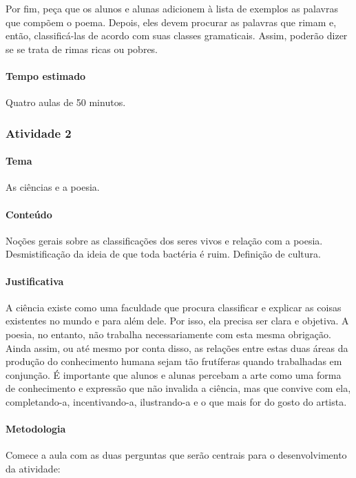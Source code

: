 \documentclass[11pt]{extarticle}
\begin{document}
Por fim, peça que os alunos e alunas adicionem à
lista de exemplos as palavras que compõem o poema.
Depois, eles devem procurar as palavras que rimam e, 
então, classificá-las de acordo
com suas classes gramaticais. Assim, poderão dizer
se se trata de rimas ricas ou pobres. 

\paragraph{Tempo estimado} Quatro aulas de 50 minutos.

\subsubsection{Atividade 2}


\paragraph{Tema} As ciências e a poesia. 

\paragraph{Conteúdo} Noções gerais sobre as classificações
dos seres vivos e relação com a poesia. Desmistificação da
ideia de que toda bactéria é ruim. Definição de cultura.

\paragraph{Justificativa} A ciência existe como uma faculdade 
que procura classificar e explicar as coisas existentes no mundo
e para além dele. Por isso, ela precisa ser clara e objetiva.
A poesia, no entanto, não trabalha necessariamente com esta
mesma obrigação. Ainda assim, ou até mesmo por conta disso,
as relações entre estas duas áreas da produção do conhecimento
humana sejam tão frutíferas quando trabalhadas em conjunção. 
É importante que alunos e alunas percebam a arte como 
uma forma de conhecimento e expressão que não invalida a ciência,
mas que convive com ela, completando-a, incentivando-a,
ilustrando-a e o que mais for do gosto do artista. 

\paragraph{Metodologia} Comece a aula com as duas perguntas
que serão centrais para o desenvolvimento da atividade:
\end{document}
